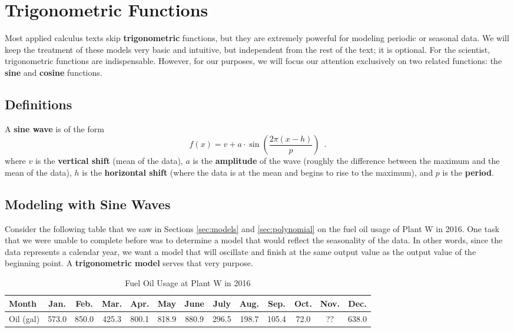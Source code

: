 \section{Trigonometric Functions}
\label{sec:trig}

Most applied calculus texts skip {\bf trigonometric} functions, but they are extremely powerful for modeling periodic or seasonal data. We will keep the treatment of these models very basic and intuitive, but independent from the rest of the text; it is optional. For the scientist, trigonometric functions are indispensable. However, for our purposes, we will focus our attention exclusively on two related functions: the {\bf sine} and {\bf cosine} functions.

\subsection{Definitions}


A {\bf sine wave} is of the form
\begin{equation}
\label{eq:sine}
f(x) = v + a \cdot \sin\left(\frac{2\pi(x-h)}{p}\right) \enspace .
\end{equation}
where $v$ is the {\bf vertical shift} (mean of the data), $a$ is the {\bf amplitude} of the wave (roughly the difference between the maximum and the mean of the data), $h$ is the {\bf horizontal shift} (where the data is at the mean and begins to rise to the maximum), and $p$ is the {\bf period}.

\subsection{Modeling with Sine Waves}

Consider the following table that we saw in Sections \ref{sec:models} and \ref{sec:polynomial} on the fuel oil usage of Plant W in 2016. One task that we were unable to complete before was to determine a model that would reflect the seasonality of the data. In other words, since the data represents a calendar year, we want a model that will oscillate and finish at the same output value as the output value of the beginning point. A {\bf trigonometric model} serves that very purpose.

\begin{table}[h!]
\centering
\begin{tabular}{l*{12}{c}}
\toprule
Month & Jan. & Feb. & Mar. & Apr. & May & June & July & Aug. & Sep. & Oct. & Nov. & Dec. \\
\midrule
Oil (gal) & 573.0 & 850.0 &  425.3 & 800.1  & 818.9 &  880.9 &  296.5 & 198.7 & 105.4 & 72.0 & ?? & 638.0\\
\bottomrule
\end{tabular}
\caption{Fuel Oil Usage at Plant W in 2016}
\label{tab:1-9-oil}
\end{table}

